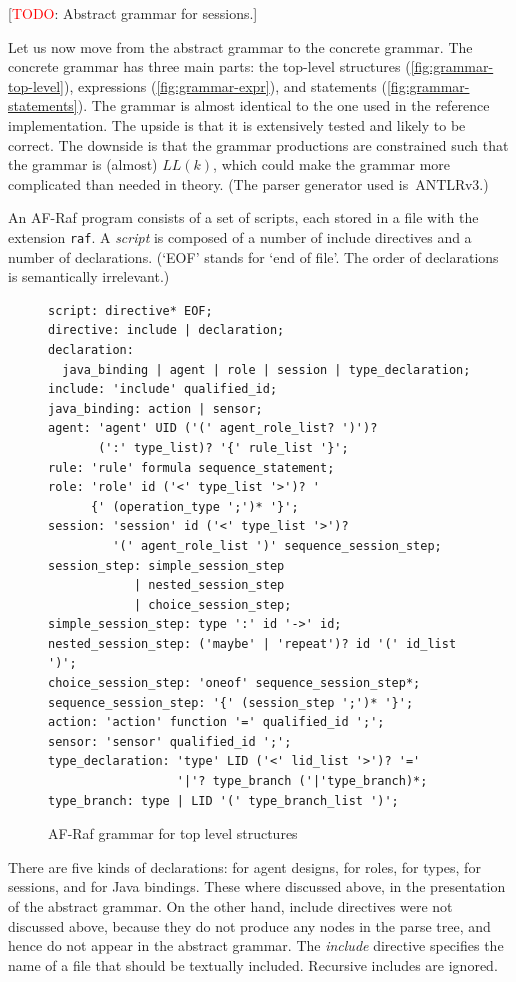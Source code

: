 \documentclass[a4paper,12pt,oneside,fleqn]{book} %
\newcommand{\todo}[1]{[\textcolor{red}{TODO}: #1]}
\begin{document}
\todo{Abstract grammar for sessions.}

Let us now move from the abstract grammar to the concrete grammar.  The
concrete grammar has three main parts: the top-level structures
(\autoref{fig:grammar-top-level}), expressions
(\autoref{fig:grammar-expr}), and statements
(\autoref{fig:grammar-statements}). The grammar is almost identical to the
one used in the reference implementation. The upside is that it is
extensively tested and likely to be correct. The downside is that the
grammar productions are constrained such that the grammar is (almost)
$LL(k)$, which could make the grammar more complicated than needed in
theory. (The parser generator used is~ANTLRv3.)

An AF-Raf program consists of a set of scripts, each stored in a file with
the extension {\tt raf}.  A {\it script\/} is composed of a number of
include directives and a number of declarations. (`EOF' stands for `end of
file'. The order of declarations is semantically irrelevant.)

\begin{figure}\footnotesize %
\begin{verbatim}
script: directive* EOF;
directive: include | declaration;
declaration:
  java_binding | agent | role | session | type_declaration;
include: 'include' qualified_id;
java_binding: action | sensor;
agent: 'agent' UID ('(' agent_role_list? ')')?
       (':' type_list)? '{' rule_list '}';
rule: 'rule' formula sequence_statement;
role: 'role' id ('<' type_list '>')? '
      {' (operation_type ';')* '}';
session: 'session' id ('<' type_list '>')?
         '(' agent_role_list ')' sequence_session_step;
session_step: simple_session_step
            | nested_session_step
            | choice_session_step;
simple_session_step: type ':' id '->' id;
nested_session_step: ('maybe' | 'repeat')? id '(' id_list ')';
choice_session_step: 'oneof' sequence_session_step*;
sequence_session_step: '{' (session_step ';')* '}';
action: 'action' function '=' qualified_id ';';
sensor: 'sensor' qualified_id ';';
type_declaration: 'type' LID ('<' lid_list '>')? '='
                  '|'? type_branch ('|'type_branch)*;
type_branch: type | LID '(' type_branch_list ')';
\end{verbatim}
\caption{AF-Raf grammar for top level structures}
\label{fig:grammar-top-level}
\end{figure} %

There are five kinds of declarations: for agent designs, for roles, for
types, for sessions, and for Java bindings. These where discussed above, in
the presentation of the abstract grammar. On the other hand, include
directives were not discussed above, because they do not produce any nodes
in the parse tree, and hence do not appear in the abstract grammar.  The
{\it include} directive specifies the name of a file that should be
textually included. Recursive includes are ignored.
\end{document}
